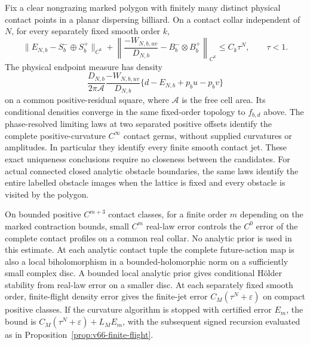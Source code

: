 \begin{theorem}
\label{thm:v66-main}
Fix a clear nongrazing marked polygon with finitely many distinct physical
contact points in a planar dispersing billiard.  On a contact collar
independent of $N$, for every separately fixed smooth order $k$,
\begin{equation}\label{eq:v67-principal-relative}
 \|E_{N,b}-S_b^-\oplus S_b^+\|_{C^k}
 +\left\|\frac{-W_{N,b,uv}}{D_{N,b}}
                       -B_b^-\otimes B_b^+\right\|_{C^k}
                                      \le C_k\tau^N,\qquad \tau<1.
\end{equation}
The physical endpoint measure has density
\[
 \frac{D_{N,b}}{2\pi\mathcal A}
       \frac{-W_{N,b,uv}}{D_{N,b}}
       \{d-E_{N,b}+p_bu-p_bv\}
\]
on a common positive-residual square, where $\mathcal A$ is the free
cell area.  Its conditional densities converge in the same fixed-order
topology to $f_{b,d}$ above.  The phase-resolved limiting laws at two separated positive offsets
identify the complete positive-curvature $C^\infty$ contact germs,
without supplied curvatures or amplitudes.  In particular they identify
every finite smooth contact jet.  These exact uniqueness conclusions
require no closeness between the candidates.
For actual connected closed analytic obstacle boundaries, the same laws
identify the entire labelled obstacle images when the lattice is fixed
and every obstacle is visited by the polygon.

On bounded positive $C^{m+3}$ contact classes, for a finite order $m$
depending on the marked contraction bounds, small $C^m$ real-law error
controls the $C^0$ error of the complete contact profiles on a common
real collar.  No analytic prior is used in this estimate.
At each analytic contact tuple the complete future-action map is also a
local biholomorphism in a bounded-holomorphic norm on a sufficiently small
complex disc.  A bounded local analytic prior gives conditional H\"older
stability from real-law error on a smaller disc.  At each separately fixed
smooth order, finite-flight density error gives the finite-jet error
$C_M(\tau^N+\varepsilon)$ on compact positive classes.  If the
curvature algorithm is stopped with certified error $E_m$, the bound
is $C_M(\tau^N+\varepsilon)+L_ME_m$, with the subsequent signed
recursion evaluated as in Proposition~\ref{prop:v66-finite-flight}.
\end{theorem}

